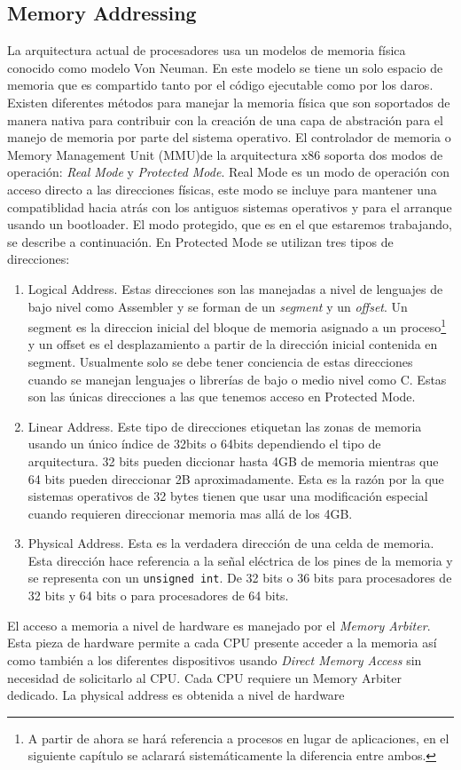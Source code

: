 \subsection{Memory Addressing} La arquitectura actual de procesadores usa un
modelos de memoria física conocido como modelo Von Neuman. En este modelo se
tiene un solo espacio de memoria que es compartido tanto por el código
ejecutable como por los daros. Existen diferentes métodos para manejar la
memoria física que son soportados de manera nativa para contribuir con la
creación de una capa de abstración para el manejo de memoria por parte del
sistema operativo. El controlador de memoria o Memory Management Unit (MMU)de
la arquitectura x86 soporta dos modos de operación: \emph{Real Mode} y
\emph{Protected Mode}.  Real Mode es un modo de operación con acceso directo a
las direcciones físicas, este modo se incluye para mantener una compatiblidad
hacia atrás con los antiguos sistemas operativos y para el arranque usando un
bootloader. El modo protegido, que es en el que estaremos trabajando, se
describe a continuación.  En Protected Mode se utilizan tres tipos de
direcciones:
\begin{enumerate}
\item Logical Address. Estas direcciones son las manejadas a nivel de lenguajes
de bajo nivel como Assembler y se forman de un \emph{segment} y un
\emph{offset}. Un segment es la direccion inicial del bloque de memoria
asignado a un proceso\footnote{A partir de ahora se hará referencia a procesos
en lugar de aplicaciones, en el siguiente capítulo se aclarará sistemáticamente
la diferencia entre ambos.} y un offset es el desplazamiento a partir de la
dirección inicial contenida en segment. Usualmente solo se debe tener
conciencia de estas direcciones cuando se manejan lenguajes o librerías de bajo
o medio nivel como C. Estas son las únicas direcciones a las que tenemos acceso
en Protected Mode.
\item Linear Address. Este tipo de direcciones etiquetan las zonas de memoria
usando un único índice de 32bits o 64bits dependiendo el tipo de
arquitectura. 32 bits pueden diccionar hasta 4GB de memoria mientras que 64
bits pueden direccionar 2B aproximadamente. Esta es la razón por la que
sistemas operativos de 32 bytes tienen que usar una modificación especial
cuando requieren direccionar memoria mas allá de los 4GB.
\item Physical Address. Esta es la verdadera dirección de una celda de
memoria. Esta dirección hace referencia a la señal eléctrica de los pines de la
memoria y se representa con un \texttt{unsigned int}. De 32 bits o 36 bits para
procesadores de 32 bits y 64 bits o para procesadores de 64 bits.
\end{enumerate} El acceso a memoria a nivel de hardware es manejado por el
\emph{Memory Arbiter}. Esta pieza de hardware permite a cada CPU presente
acceder a la memoria así como también a los diferentes dispositivos usando
\emph{Direct Memory Access} sin necesidad de solicitarlo al CPU. Cada CPU
requiere un Memory Arbiter dedicado.  La physical address es obtenida a nivel
de hardware


